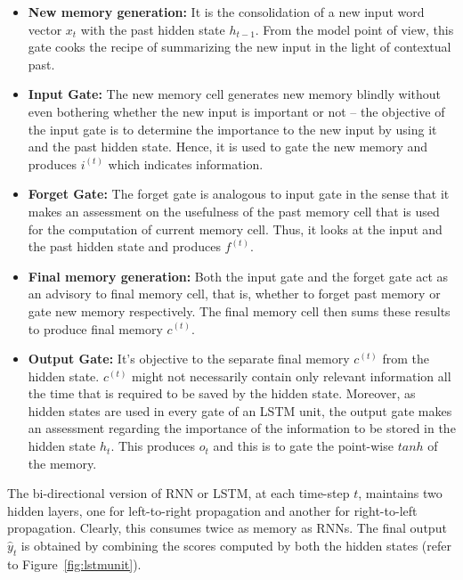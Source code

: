 \begin{itemize}
	\item \textbf{New memory generation: }It is the consolidation of a new input word vector $x_t$ with the past hidden state $h_{t-1}$. From the model point of view, this gate cooks the recipe of summarizing the new input in the light of contextual past.

	\item \textbf{Input Gate: }The new memory cell generates new memory blindly without even bothering whether the new input is important or not -- the objective of the input gate is to determine the importance to the new input by using it and the past hidden state. Hence, it is used to gate the new memory and produces $i^{(t)}$ which indicates information.

	\item \textbf{Forget Gate: }The forget gate is analogous to input gate in the sense that it makes an assessment on the usefulness of the past memory cell that is used for the computation of current memory cell. Thus, it looks at the input and the past hidden state and produces $f^{(t)}$.

	\item \textbf{Final memory generation: }Both the input gate and the forget gate act as an advisory to final memory cell, that is, whether to forget past memory or gate new memory respectively. The final memory cell then sums these results to produce final memory $c^{(t)}$.

	\item \textbf{Output Gate: } It's objective to the separate final memory $c^{(t)}$ from the hidden state. $c^{(t)}$ might not necessarily contain only relevant information all the time that is required to be saved by the hidden state. Moreover, as hidden states are used in every gate of an LSTM unit, the output gate makes an assessment regarding the importance of the information to be stored in the hidden state $h_t$. This produces $o_t$ and this is to gate the point-wise $tanh$ of the memory.
\end{itemize}

The bi-directional version of RNN or LSTM, at each time-step $t$, maintains two hidden layers, one for left-to-right propagation and another for right-to-left propagation. Clearly, this consumes twice as memory as RNNs. The final output $\widehat{y}_t$ is obtained by combining the scores computed by both the hidden states (refer to Figure~\ref{fig:lstmunit}).



